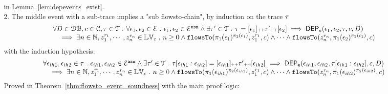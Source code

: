 in Lemma~\ref{lem:depevents_exist}.
%
\\
2. The middle event with a sub-trace implies a "sub flowsto-chain", 
 by induction on the trace $\mathtt{\tau}$
%
\[
  \begin{array}{l}
		\forall D \in \mathcal{DB} , c \in \mathcal{C}, \mathtt{\tau} \in \mathcal{T} ~.~ \forall \mathtt{\epsilon}_1, \mathtt{\epsilon}_2 \in \mathcal{E} ~.~
    \mathtt{\epsilon}_1, \mathtt{\epsilon}_2 \in \mathcal{E}^{\mathtt{{asn}}} \land 
		 \exists \mathtt{\tau}' \in \mathcal{T} ~.~ \mathtt{\tau} = [\mathtt{\epsilon}_1] {\scriptscriptstyle ++} \mathtt{\tau}' {\scriptscriptstyle ++} [\mathtt{\epsilon}_2]
		\implies
		\mathsf{DEP_{\mathtt{e}}}(\mathtt{\epsilon}_1, \mathtt{\epsilon}_2, \mathtt{\tau}, c, D) 
		\\ \quad 
		\implies 
    \exists n \in \mathbb{N}, z_1^{r_1}, \cdots, z_n^{r_n} \in \mathbb{LV}_{{c}} ~.~ n \geq 0 \land
		\mathtt{flowsTo}(\pi_1(\mathtt{\epsilon}_1)^{\pi_2(\mathtt{\epsilon}_1)},  z_1^{r_1}, c) 
    \land \cdots \land \mathtt{flowsTo}(z_n^{r_n}, \pi_1(\mathtt{\epsilon}_2)^{\pi_2(\mathtt{\epsilon}_2)}, c) 
	\end{array}
\]
with the induction hypothesis:
\[
  \begin{array}{l}
    \forall \mathtt{\epsilon}_{ih1}, \mathtt{\epsilon}_{ih2} \in \mathtt{\tau} ~.~ \mathtt{\epsilon}_{ih1}, \mathtt{\epsilon}_{ih2} \in \mathcal{E}^{\mathtt{{asn}}} 
    \land
		 \exists \mathtt{\tau}' \in \mathcal{T} ~.~ 
     \mathtt{\tau}[\mathtt{\epsilon}_{ih1}:\mathtt{\epsilon}_{ih2}] = [\mathtt{\epsilon}_{ih1}] {\scriptscriptstyle ++} \mathtt{\tau}' {\scriptscriptstyle ++} [\mathtt{\epsilon}_{ih2}]
		\implies
		\mathsf{DEP_{\mathtt{e}}}(\mathtt{\epsilon}_{ih1}, \mathtt{\epsilon}_{ih2}, \mathtt{\tau}[\mathtt{\epsilon}_{ih1}:\mathtt{\epsilon}_{ih2}], c, D) 
		\\ \quad 
		\implies 
    \exists n \in \mathbb{N}, z_1^{r_1}, \cdots, z_n^{r_n} \in \mathbb{LV}_{{c}} ~.~ n \geq 0 \land
		\mathtt{flowsTo}(\pi_1(\mathtt{\epsilon}_{ih1})^{\pi_2(\mathtt{\epsilon}_{ih1})},  z_1^{r_1}, c) 
    \land \cdots \land \mathtt{flowsTo}(z_n^{r_n}, \pi_1(\mathtt{\epsilon}_{ih2})^{\pi_2(\mathtt{\epsilon}_{ih2})}, c) 
  \end{array}
  \]
%
Proved in Theorem~\ref{thm:flowsto_event_soundness} with the main proof logic:
\\
